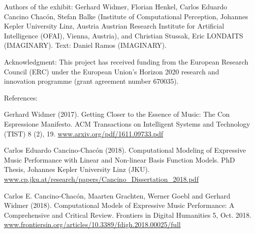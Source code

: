 \vfill

Authors of the exhibit: Gerhard Widmer, Florian Henkel, Carlos Eduardo Cancino Chacón, Stefan Balke (Institute of Computational Perception, Johannes Kepler University Linz, Austria
Austrian Research Institute for Artificial Intelligence (OFAI), Vienna, Austria), and Christian Stussak, Eric LONDAITS (IMAGINARY). Text: Daniel Ramos (IMAGINARY).

Acknowledgment: This project has received funding from the European Research Council (ERC) under the European Union's Horizon 2020 research and innovation programme (grant agreement number 670035).

References:

Gerhard Widmer (2017). Getting Closer to the Essence of Music: The Con Espressione Manifesto. ACM Transactions on Intelligent Systems and Technology (TIST) 8 (2), 19. \url{www.arxiv.org/pdf/1611.09733.pdf}

Carlos Eduardo Cancino-Chacón (2018). Computational Modeling of Expressive Music Performance with Linear and Non-linear Basis Function Models. PhD Thesis, Johannes Kepler University Linz (JKU). \url{www.cp.jku.at/research/papers/Cancino_Dissertation_2018.pdf}

Carlos E. Cancino-Chacón, Maarten Grachten, Werner Goebl and Gerhard Widmer (2018). Computational Models of Expressive Music Performance: A Comprehensive and Critical Review. Frontiers in Digital Humanities 5, Oct. 2018. \url{www.frontiersin.org/articles/10.3389/fdigh.2018.00025/full}

